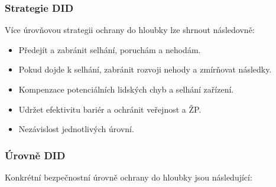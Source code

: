 \subsubsection{Strategie DID}

Více úrovňovou strategii ochrany do hloubky lze shrnout následovně:

\begin{itemize}
    \item Předejít a zabránit selhání, poruchám a nehodám.
    \item Pokud dojde k selhání, zabránit rozvoji nehody a zmírňovat následky.
    \item Kompenzace potenciálních lidských chyb a selhání zařízení.
    \item Udržet efektivitu bariér a ochránit veřejnost a ŽP.
    \item Nezávislost jednotlivých úrovní.
\end{itemize}

\subsubsection{Úrovně DID}

Konkrétní bezpečnostní úrovně ochrany do hloubky jsou následující:

